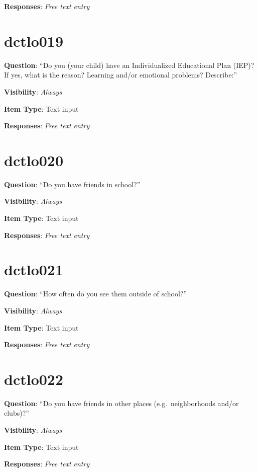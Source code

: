 \documentclass[]{book}
\begin{document}
\textbf{Responses}: \emph{Free text entry}

\hypertarget{dctlo019}{%
\section{dctlo019}\label{dctlo019}}

\textbf{Question}: ``Do you (your child) have an Individualized Educational Plan (IEP)? If yes, what is the reason? Learning and/or emotional problems? Describe:''

\textbf{Visibility}: \emph{Always}

\textbf{Item Type}: Text input

\textbf{Responses}: \emph{Free text entry}

\hypertarget{dctlo020}{%
\section{dctlo020}\label{dctlo020}}

\textbf{Question}: ``Do you have friends in school?''

\textbf{Visibility}: \emph{Always}

\textbf{Item Type}: Text input

\textbf{Responses}: \emph{Free text entry}

\hypertarget{dctlo021}{%
\section{dctlo021}\label{dctlo021}}

\textbf{Question}: ``How often do you see them outside of school?''

\textbf{Visibility}: \emph{Always}

\textbf{Item Type}: Text input

\textbf{Responses}: \emph{Free text entry}

\hypertarget{dctlo022}{%
\section{dctlo022}\label{dctlo022}}

\textbf{Question}: ``Do you have friends in other places (e.g.~neighborhoods and/or clubs)?''

\textbf{Visibility}: \emph{Always}

\textbf{Item Type}: Text input

\textbf{Responses}: \emph{Free text entry}
\end{document}
